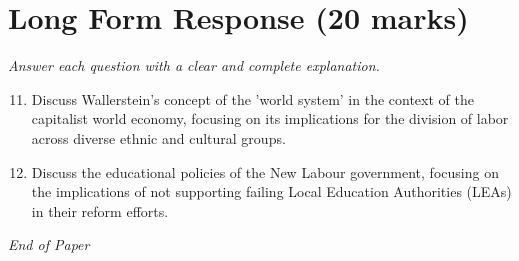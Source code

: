 \documentclass[12pt]{article}
\begin{document}
\section*{Long Form Response (20 marks)}
\textit{Answer each question with a clear and complete explanation.}
\begin{enumerate}[label=\arabic*.]
\setcounter{enumi}{10}
\item Discuss Wallerstein's concept of the 'world system' in the context of the capitalist world economy, focusing on its implications for the division of labor across diverse ethnic and cultural groups.
\item Discuss the educational policies of the New Labour government, focusing on the implications of not supporting failing Local Education Authorities (LEAs) in their reform efforts.
\end{enumerate}

\vfill
\noindent\textit{End of Paper}
\end{document}
